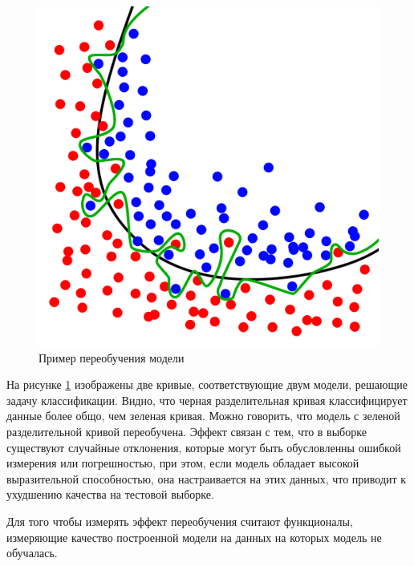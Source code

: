 \begin{figure} 
    \vspace{-2ex}
    \includegraphics[width=\linewidth]{src/img/wiki_overfitting.png}
    \caption{Пример переобучения модели \cite{wiki:overfitting}}
    \label{fig:wiki_overfitting}
\end{figure}

На рисунке \ref{fig:wiki_overfitting} изображены две кривые, соответствующие двум модели, решающие задачу классификации. Видно, что черная разделительная кривая классифицирует данные более общо, чем зеленая кривая. Можно говорить, что модель с зеленой разделительной кривой переобучена. Эффект связан с тем, что в выборке существуют случайные отклонения, которые могут быть обусловленны ошибкой измерения или погрешностью, при этом, если модель обладает высокой выразительной способностью, она настраивается на этих данных, что приводит к ухудшению качества на тестовой выборке.

Для того чтобы измерять эффект переобучения считают функционалы, измеряющие качество построенной модели на данных на которых модель не обучалась. 


